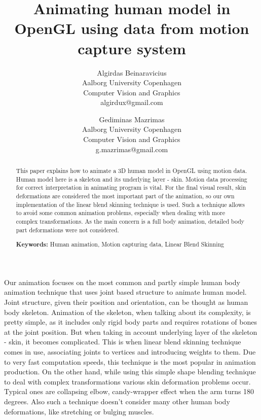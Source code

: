 \documentclass[times, 10pt,twocolumn]{article}
\begin{document}
\title{Animating human model in OpenGL using data from motion capture system}

\author{Algirdas Beinaravicius\\
Aalborg University Copenhagen\\ Computer Vision and Graphics\\algirdux@gmail.com
\and
Gediminas Mazrimas\\
Aalborg University Copenhagen\\ Computer Vision and Graphics\\g.mazrimas@gmail.com
}

\maketitle
\thispagestyle{empty}

\begin{abstract}
   This paper explains how to animate a 3D human model in OpenGL using motion data. Human model here is a skeleton and its underlying layer - skin.
   Motion data processing for correct interpretation in animating program is vital.
   For the final visual result, skin deformations are considered the most important part of the animation, so our own implementation of the linear blend skinning technique is used. Such a technique allows to avoid some common animation problems, especially when dealing with more complex transformations. As the main concern is a full body animation, detailed body part deformations were not considered.

   \textbf{Keywords:} Human animation, Motion capturing data, Linear Blend Skinning
\end{abstract}




Our animation focuses on the most common and partly simple human
body animation technique that uses joint based structure to animate human model. Joint structure,
given their position and orientation, can be thought as human body skeleton.
Animation of the skeleton, when talking about its complexity, is pretty simple,
as it includes only rigid body parts and requires rotations of bones at the joint position.
But when taking in account underlying layer of the skeleton - skin, it becomes complicated. This is when linear blend skinning technique comes in use, associating joints to vertices and introducing weights to them. Due to very fast computation speeds, this technique is the most popular
in animation production. On the other hand, while using this simple shape blending technique
to deal with complex transformations various skin deformation problems occur. Typical ones are collapsing elbow, candy-wrapper effect when the arm turns 180 degrees.
Also such a technique doesn't consider many other human body deformations, like stretching or bulging muscles.
\end{document}

